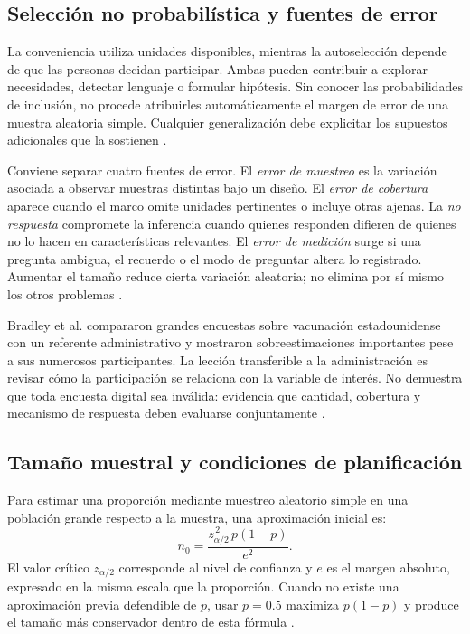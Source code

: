{\subsection{Selección no probabilística y fuentes de error}
La conveniencia utiliza unidades disponibles, mientras la autoselección depende de que las personas decidan participar. Ambas pueden contribuir a explorar necesidades, detectar lenguaje o formular hipótesis. Sin conocer las probabilidades de inclusión, no procede atribuirles automáticamente el margen de error de una muestra aleatoria simple. Cualquier generalización debe explicitar los supuestos adicionales que la sostienen \citep{holmesBusiness2023}.

Conviene separar cuatro fuentes de error. El \textit{error de muestreo} es la variación asociada a observar muestras distintas bajo un diseño. El \textit{error de cobertura} aparece cuando el marco omite unidades pertinentes o incluye otras ajenas. La \textit{no respuesta} compromete la inferencia cuando quienes responden difieren de quienes no lo hacen en características relevantes. El \textit{error de medición} surge si una pregunta ambigua, el recuerdo o el modo de preguntar altera lo registrado. Aumentar el tamaño reduce cierta variación aleatoria; no elimina por sí mismo los otros problemas \citep{bradley2021}.

Bradley et al. compararon grandes encuestas sobre vacunación estadounidense con un referente administrativo y mostraron sobreestimaciones importantes pese a sus numerosos participantes. La lección transferible a la administración es revisar cómo la participación se relaciona con la variable de interés. No demuestra que toda encuesta digital sea inválida: evidencia que cantidad, cobertura y mecanismo de respuesta deben evaluarse conjuntamente \citep{bradley2021}.

\subsection{Tamaño muestral y condiciones de planificación}
Para estimar una proporción mediante muestreo aleatorio simple en una población grande respecto a la muestra, una aproximación inicial es:
\[
 n_0=\frac{z_{\alpha/2}^{\,2}\,p(1-p)}{e^2}.
\]
El valor crítico $z_{\alpha/2}$ corresponde al nivel de confianza y $e$ es el margen absoluto, expresado en la misma escala que la proporción. Cuando no existe una aproximación previa defendible de $p$, usar $p=0.5$ maximiza $p(1-p)$ y produce el tamaño más conservador dentro de esta fórmula \citep{holmesBusiness2023}.

}
